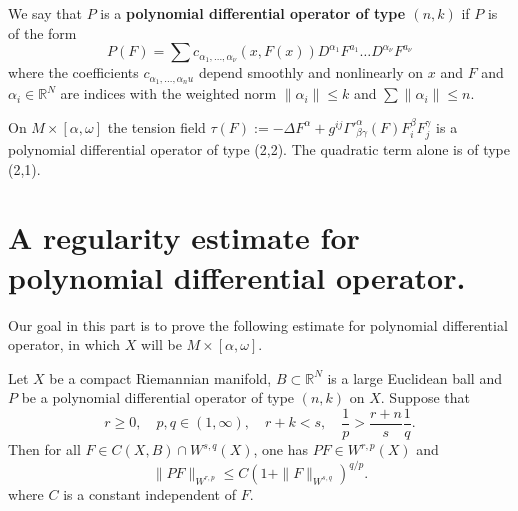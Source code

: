 \iffalse
\begin{info}
The PDF version of this page can be downloaded by replacing \texttt{html} in the its address by
\texttt{pdf}. 
For example \texttt{/html/sheaf-cohomology.html} should become \texttt{/pdf/sheaf-cohomology.pdf}.
\end{info}
\fi

\begin{definition}
We say that \(P\) is a \textbf{polynomial differential operator of type \((n,k)\)} if \(P\)
is of the form
\[
 P(F) = \sum c_{\alpha_1,\dots, \alpha_\nu} (x, F(x)) D^{\alpha_1} F^{a_1} \dots D^{\alpha_\nu} F^{a_{\nu}}
\]
where the coefficients \(c_{\alpha_1,\dots,\alpha_nu}\) depend smoothly and nonlinearly on \(x\) and \(F\) and \(\alpha_i\in \mathbb{R}^N\) are indices with the weighted norm \(\|\alpha_i\| \leq k\) and \(\sum \|\alpha_i\| \leq n\).
\end{definition}

\begin{exampl}
On \(M\times [\alpha,\omega]\) the tension field \(\tau(F) :=  -\Delta F^\alpha + g^{ij}\Gamma'^\alpha_{\beta\gamma}(F)
F^\beta_i F^\gamma_j\) is a polynomial differential operator of type (2,2). The quadratic
term alone is of type (2,1).
\end{exampl}

\section{A regularity estimate for polynomial differential operator.}
\label{sec:orgde1591a}
Our goal in this part is to prove the following estimate for polynomial differential
operator, in which \(X\) will be \(M\times[\alpha,\omega]\).

\begin{theorem}
\label{thm:reg-poly-diff}
Let \(X\) be a compact Riemannian manifold, \(B\subset \mathbb{R}^N\) is a
large Euclidean ball and \(P\) be a polynomial differential
operator of type \((n,k)\) on \(X\). Suppose that
\begin{equation}
\label{eq:cond:thm:reg-poly-diff}
 r\geq 0,\quad p,q\in (1,\infty),\quad r+k < s, \quad \frac{1}{p}> \frac{r+n}{s} \frac{1}{q}.
\end{equation}
Then for all \(F\in C (X,B) \cap W^{s,q}(X)\), one has \(PF\in W^{r,p}(X)\) and
\[
 \|P F \|_{W^{r,p}} \leq C\left(1 + \|F\|_{W^{s,q}}\right)^{q/p}.
\]
where \(C\) is a constant independent of \(F\).
\end{theorem}

